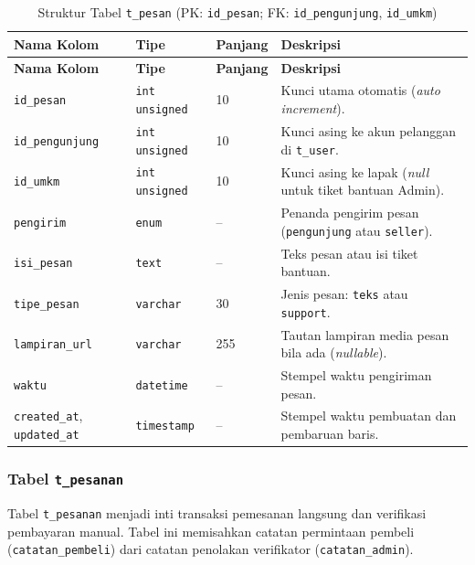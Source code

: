 \renewcommand{\arraystretch}{1.20}
\begin{longtable}{|L{3.85cm}|L{2.4cm}|C{1.65cm}|L{\dimexpr\textwidth-3.85cm-2.4cm-1.65cm-8\arrayrulewidth\relax}|}
\caption{Struktur Tabel \texttt{t\_pesan} (PK: \texttt{id\_pesan}; FK: \texttt{id\_pengunjung}, \texttt{id\_umkm})}
\label{tab:skema-pesan} \\
\hline
{}
\textbf{Nama Kolom} & \textbf{Tipe} & \textbf{Panjang} & \textbf{Deskripsi} \\
\hline
\endfirsthead
\hline
{}
\textbf{Nama Kolom} & \textbf{Tipe} & \textbf{Panjang} & \textbf{Deskripsi} \\
\hline
\endhead
\hline
\endfoot
\texttt{id\_pesan} & \texttt{int unsigned} & 10 & Kunci utama otomatis (\textit{auto increment}). \\
\hline
\texttt{id\_pengunjung} & \texttt{int unsigned} & 10 & Kunci asing ke akun pelanggan di \texttt{t\_user}. \\
\hline
\texttt{id\_umkm} & \texttt{int unsigned} & 10 & Kunci asing ke lapak (\textit{null} untuk tiket bantuan Admin). \\
\hline
\texttt{pengirim} & \texttt{enum} & -- & Penanda pengirim pesan (\texttt{pengunjung} atau \texttt{seller}). \\
\hline
\texttt{isi\_pesan} & \texttt{text} & -- & Teks pesan atau isi tiket bantuan. \\
\hline
\texttt{tipe\_pesan} & \texttt{varchar} & 30 & Jenis pesan: \texttt{teks} atau \texttt{support}. \\
\hline
\texttt{lampiran\_url} & \texttt{varchar} & 255 & Tautan lampiran media pesan bila ada (\textit{nullable}). \\
\hline
\texttt{waktu} & \texttt{datetime} & -- & Stempel waktu pengiriman pesan. \\
\hline
\texttt{created\_at}, \texttt{updated\_at} & \texttt{timestamp} & -- & Stempel waktu pembuatan dan pembaruan baris. \\
\hline
\end{longtable}

\subsubsection{Tabel \texttt{t\_pesanan}}
Tabel \texttt{t\_pesanan} menjadi inti transaksi pemesanan langsung dan verifikasi pembayaran manual. Tabel ini memisahkan catatan permintaan pembeli (\texttt{catatan\_pembeli}) dari catatan penolakan verifikator (\texttt{catatan\_admin}).

